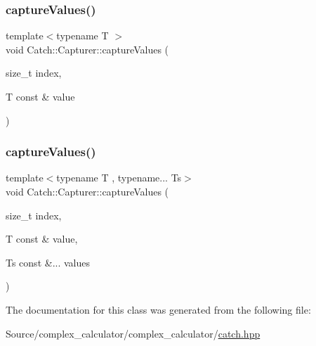 \mbox{\label{class_catch_1_1_capturer_a60d08e6db2e54740bb2298bbbec3bc0b}} 
\subsubsection{\texorpdfstring{capture\+Values()}{captureValues()}\hspace{0.1cm}{\footnotesize\ttfamily [1/2]}}
{\footnotesize\ttfamily template$<$typename T $>$ \\
void Catch\+::\+Capturer\+::capture\+Values (\begin{DoxyParamCaption}\item[{size\+\_\+t}]{index,  }\item[{T const \&}]{value }\end{DoxyParamCaption})\hspace{0.3cm}{\ttfamily [inline]}}

\mbox{\label{class_catch_1_1_capturer_a76f2a097cfeb3042688300b81eb9bcbc}} 
\subsubsection{\texorpdfstring{capture\+Values()}{captureValues()}\hspace{0.1cm}{\footnotesize\ttfamily [2/2]}}
{\footnotesize\ttfamily template$<$typename T , typename... Ts$>$ \\
void Catch\+::\+Capturer\+::capture\+Values (\begin{DoxyParamCaption}\item[{size\+\_\+t}]{index,  }\item[{T const \&}]{value,  }\item[{Ts const \&...}]{values }\end{DoxyParamCaption})\hspace{0.3cm}{\ttfamily [inline]}}



The documentation for this class was generated from the following file\+:\begin{DoxyCompactItemize}
\item 
Source/complex\+\_\+calculator/complex\+\_\+calculator/\mbox{\hyperlink{catch_8hpp}{catch.\+hpp}}\end{DoxyCompactItemize}
